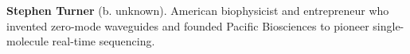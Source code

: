 \textbf{Stephen Turner} (b. unknown). American biophysicist and entrepreneur who invented zero-mode waveguides and founded Pacific Biosciences to pioneer single-molecule real-time sequencing.


